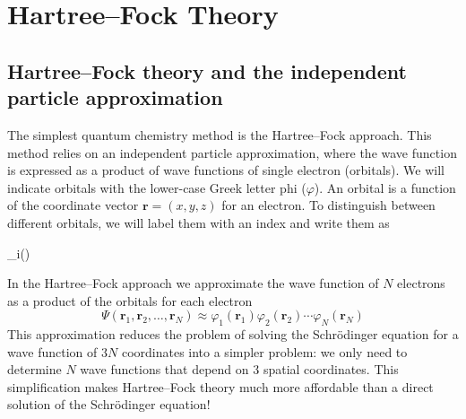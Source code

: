 \documentclass[../Main/chem371-notes.tex]{subfiles}
\begin{document}
\chapter{Hartree--Fock Theory}

\section{Hartree--Fock theory and the independent particle approximation}
The simplest quantum chemistry method is the Hartree--Fock approach.
This method relies on an independent particle approximation, where the wave function is expressed as a product of wave functions of single electron (orbitals).
We will indicate orbitals with the lower-case Greek letter phi ($\varphi$).
An orbital is a function of the coordinate vector $\mathbf{r} = (x,y,z)$ for an electron.
To distinguish between different orbitals, we will label them with an index and write them as
\begin{iequation}
\varphi_i()
\end{iequation}

In the Hartree--Fock approach we approximate the wave function of $N$ electrons as a product of the orbitals for each electron
\begin{equation}
\label{eq:hartree_prod}
\Psi(\mathbf{r}_1, \mathbf{r}_2, \ldots, \mathbf{r}_N) \approx \varphi_1(\mathbf{r}_1) \varphi_2(\mathbf{r}_2) \cdots \varphi_N(\mathbf{r}_N)
\end{equation}
This approximation reduces the problem of solving the Schr\"{o}dinger equation for a wave function of $3N$ coordinates into a simpler problem: we only need to determine $N$ wave functions that depend on 3 spatial coordinates. 
This simplification makes Hartree--Fock theory much more affordable than a direct solution of the Schr\"{o}dinger equation!
\end{document}

